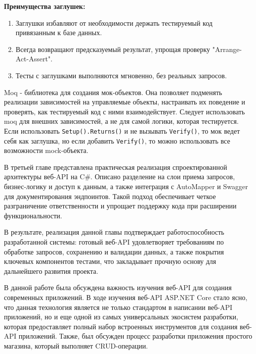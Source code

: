 \documentclass[a4paper,12pt]{report}
\begin{document}
\textbf{Преимущества заглушек:}
\begin{enumerate}
    \item
        Заглушки избавляют от необходимости держать тестируемый код привязанным к базе данных.
    \item
        Всегда возвращают предсказуемый результат, упрощая проверку "Arrange-Act-Assert".
    \item
        Тесты с заглушками выполняются мгновенно, без реальных запросов.
\end{enumerate}

Moq - библиотека для создания мок-объектов. Она позволяет подменять реализации зависимостей на управляемые объекты, 
настраивать их поведение и проверять, как тестируемый код с ними взаимодействует. Следует использовать moq для внешних зависимостей, 
а не для самой логики, которая тестируется. Если использовать \texttt{Setup().Returns()} и не вызывать \texttt{Verify()}, 
то мок ведет себя как заглушка, но если добавить \texttt{Verify()}, то можно использовать все возможности mock-объекта. 


В третьей главе представлена практическая реализация спроектированной архитектуры веб-\acs{API} на C\#. 
Описано разделение на слои приема запросов, бизнес-логику и доступ к данным, а также интеграция 
с AutoMapper и Swagger для документирования эндпоинтов. Такой подход обеспечивает четкое 
разграничение ответственности и упрощает поддержку кода при расширении функциональности.

В результате, реализация данной главы подтверждает работоспособность разработанной системы: 
готовый веб-\acs{API} удовлетворяет требованиям по обработке запросов, сохранению и валидации данных, 
а также покрытия ключевых компонентов тестами, что закладывает прочную основу для дальнейшего развития проекта.
    

В данной работе была обсуждена важность изучения веб-\acs{API} для создания современных приложений. 
В ходе изучения веб-\acs{API} ASP.NET Core стало ясно, что данная технология является не только стандартом 
в написании веб-\acs{API} приложений, но и еще одной из самых универсальных экосистем разработки, которая 
предоставляет полный набор встроенных инструментов для создания веб-\acs{API} приложений. Также, был обсужден 
процесс разработки приложения простого магазина, который выполняет \acs{CRUD}-операции.
\end{document}
